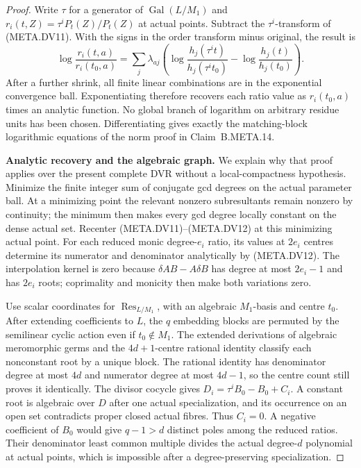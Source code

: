 \begin{proof}
Write $\tau$ for a generator of $\operatorname{Gal}(L/M_1)$
and $r_i(t,Z)=\tau^iP_t(Z)/P_t(Z)$ at actual points.
Subtract the $\tau^i$-transform of (META.DV11).
With the signs in the order transform minus original,
the result is
\[
 \log\frac{r_i(t,a)}{r_i(t_0,a)}
 =\sum_j\lambda_{aj}
   \left(
    \log\frac{h_j(\tau^it)}{h_j(\tau^it_0)}
       -\log\frac{h_j(t)}{h_j(t_0)}
   \right).                                                   \tag{META.DV12}
\]
After a further shrink, all finite linear combinations
are in the exponential convergence ball.
Exponentiating therefore recovers each ratio value
as $r_i(t_0,a)$ times an analytic function.
No global branch of logarithm on arbitrary residue
units has been chosen.
Differentiating gives exactly the matching-block
logarithmic equations of the norm proof in
Claim~B.META.14.

\medskip\noindent\textbf{Analytic recovery and the algebraic graph.}
We explain why that proof applies over the present
complete DVR without a local-compactness hypothesis.
Minimize the finite integer sum of conjugate gcd
degrees on the actual parameter ball.
At a minimizing point the relevant nonzero
subresultants remain nonzero by continuity;
the minimum then makes every gcd degree locally
constant on the dense actual set.
Recenter (META.DV11)--(META.DV12) at this
minimizing actual point.
For each reduced monic degree-$e_i$ ratio, its
values at $2e_i$ centres determine its numerator
and denominator analytically by (META.DV12).
The interpolation kernel is zero because
$\delta A B-A\delta B$ has degree at most $2e_i-1$
and has $2e_i$ roots; coprimality and monicity
then make both variations zero.

Use scalar coordinates for $\operatorname{Res}_{L/M_1}$,
with an algebraic $M_1$-basis and centre $t_0$.
After extending coefficients to $L$, the $q$
embedding blocks are permuted by the semilinear
cyclic action even if $t_0\notin M_1$.
The extended derivations of algebraic meromorphic
germs and the $4d+1$-centre rational identity
classify each nonconstant root by a unique block.
The rational identity has denominator degree at
most $4d$ and numerator degree at most $4d-1$,
so the centre count still proves it identically.
The divisor cocycle gives
$D_i=\tau^i B_0-B_0+C_i$.
A constant root is algebraic over $D$ after one
actual specialization, and its occurrence on an
open set contradicts proper closed actual fibres.
Thus $C_i=0$.
A negative coefficient of $B_0$ would give
$q-1>d$ distinct poles among the reduced ratios.
Their denominator least common multiple divides
the actual degree-$d$ polynomial at actual points,
which is impossible after a degree-preserving
specialization.


\end{proof}
